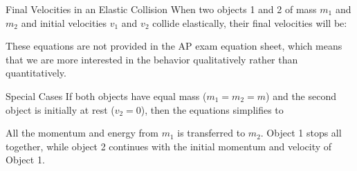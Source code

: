 \documentclass[12pt,compress,aspectratio=169]{beamer}
\begin{document}
%  
%




\begin{frame}{Final Velocities in an Elastic Collision}
  When two objects \num{1} and \num{2} of mass $m_1$ and $m_2$ and initial
  velocities $v_1$ and $v_2$ collide elastically, their final velocities will
  be:
  

  These equations are not provided in the AP exam equation sheet, which means
  that we are more interested in the behavior qualitatively rather than
  quantitatively.
\end{frame}




\begin{frame}{Special Cases}
  If both objects have equal mass ($m_1=m_2=m$) and the second object is
  initially at rest ($v_2=0$), then the equations simplifies to
  

  All the momentum and energy from $m_1$ is transferred to $m_2$. Object 1
  stops all together, while object 2 continues with the initial momentum and
  velocity of Object 1.
\end{frame}
\end{document}
